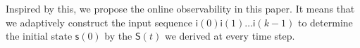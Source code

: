 Inspired by this, we propose the online observability in this paper. It means that we adaptively construct the input sequence $\mathsf{i}(0)\mathsf{i}(1)\ldots\mathsf{i}(k-1)$ to determine the initial state $\mathsf{s}(0)$ by the $\mathsf{S}(t)$ we derived at every time step. %


